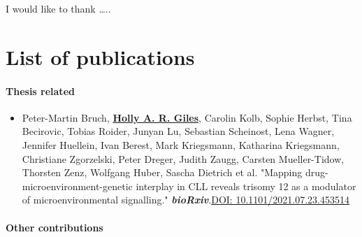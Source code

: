 \documentclass[11pt, a4paper, twosided]{book}
\begin{document}
I would like to thank \ldots..
\newpage\null\newpage


    \hypertarget{list-of-publications}{%
    \chapter*{List of publications}\label{list-of-publications}}

    \hypertarget{thesis-related}{%
    \subsubsection*{Thesis related}\label{thesis-related}}
    \begin{itemize}
        \item  Peter-Martin Bruch\ast,  \textbf{\underline{Holly A. R. Giles}}\ast, Carolin Kolb, Sophie Herbst, Tina Becirovic, Tobias Roider, Junyan Lu, Sebastian Scheinost, Lena Wagner, Jennifer Huellein, Ivan Berest, Mark Kriegsmann, Katharina Kriegsmann, Christiane Zgorzelski, Peter Dreger, Judith Zaugg, Carsten Mueller-Tidow, Thorsten Zenz, Wolfgang Huber, Sascha Dietrich et al. "Mapping drug-microenvironment-genetic interplay in CLL reveals trisomy 12 as a modulator of microenvironmental signalling." \textbf{\textit{bioRxiv}}.\href{https://doi.org/10.1101/2021.07.23.453514}{DOI: 10.1101/2021.07.23.453514} 
        
    \end{itemize}
    \hypertarget{other-contributions}{%
    \subsubsection*{Other contributions}\label{other-contributions}}
\end{document}
